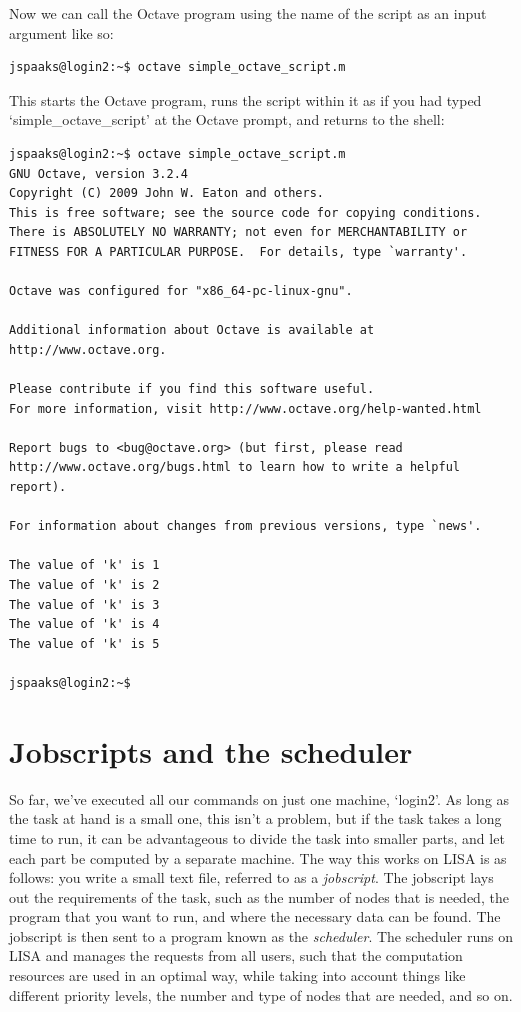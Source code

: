 Now we can call the Octave program using the name of the script as an input argument like so:
\begin{lstlisting}[style=basic,style=bash]
jspaaks@login2:~$ octave simple_octave_script.m
\end{lstlisting}
This starts the Octave program, runs the script within it as if you had typed `simple\_octave\_script' at the Octave prompt, and returns to the shell:
\begin{lstlisting}[style=basic,style=bash]
jspaaks@login2:~$ octave simple_octave_script.m
GNU Octave, version 3.2.4
Copyright (C) 2009 John W. Eaton and others.
This is free software; see the source code for copying conditions.
There is ABSOLUTELY NO WARRANTY; not even for MERCHANTABILITY or
FITNESS FOR A PARTICULAR PURPOSE.  For details, type `warranty'.

Octave was configured for "x86_64-pc-linux-gnu".

Additional information about Octave is available at http://www.octave.org.

Please contribute if you find this software useful.
For more information, visit http://www.octave.org/help-wanted.html

Report bugs to <bug@octave.org> (but first, please read
http://www.octave.org/bugs.html to learn how to write a helpful report).

For information about changes from previous versions, type `news'.

The value of 'k' is 1
The value of 'k' is 2
The value of 'k' is 3
The value of 'k' is 4
The value of 'k' is 5

jspaaks@login2:~$
\end{lstlisting}

\section{Jobscripts and the scheduler}

So far, we've executed all our commands on just one machine, `login2'. As long as the task at hand is a small one, this isn't a problem, but if the task takes a long time to run, it can be advantageous to divide the task into smaller parts, and let each part be computed by a separate machine. The way this works on LISA is as follows: you write a small text file, referred to as a  \textit{jobscript}. The jobscript lays out the requirements of the task,  such as the number of nodes that is needed, the program that you want to run, and where the necessary data can be found. The jobscript is then sent to a program known as the \textit{scheduler}. The scheduler runs on LISA and manages the requests from all users, such that the computation resources are used in an optimal way, while taking into account things like different priority levels, the number and type of nodes that are needed, and so on.

